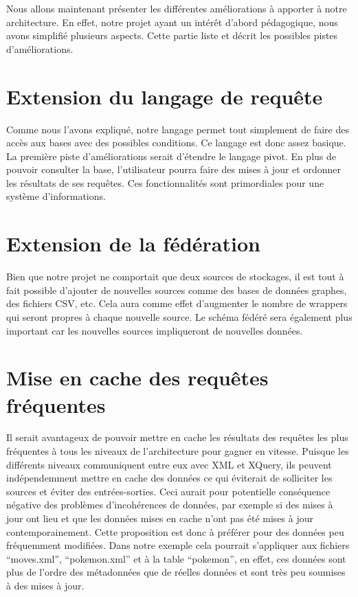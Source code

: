 Nous allons maintenant présenter les différentes améliorations à apporter à notre architecture. En effet, notre projet ayant un intérêt d’abord pédagogique, nous avons simplifié plusieurs aspects. Cette partie liste et décrit les possibles pistes d’améliorations.

\section{Extension du langage de requête}

Comme nous l’avons expliqué, notre langage permet tout simplement de faire des accès aux bases avec des possibles conditions. Ce langage est donc assez basique. La première piste d’améliorations serait d’étendre le langage pivot. En plus de pouvoir consulter la base, l’utilisateur pourra faire des mises à jour et ordonner les résultats de ses requêtes. Ces fonctionnalités sont primordiales pour une système d’informations.

\section{Extension de la fédération}

Bien que notre projet ne comportait que deux sources de stockages, il est tout à fait possible d’ajouter de nouvelles sources comme des bases de données graphes, des fichiers CSV, etc. Cela aura comme effet d’augmenter le nombre de wrappers qui seront propres à chaque nouvelle source. Le schéma fédéré sera également plus important car les nouvelles sources impliqueront de nouvelles données.

\section{ Mise en cache des requêtes fréquentes}

Il serait avantageux de pouvoir mettre en cache les résultats des requêtes les plus fréquentes à tous les niveaux de l’architecture pour gagner en vitesse. Puisque les différents niveaux communiquent entre eux avec XML et XQuery, ils peuvent indépendemment mettre en cache des données ce qui éviterait de solliciter les sources et éviter des entrées-sorties. Ceci aurait pour potentielle conséquence négative des problèmes d’incohérences de données, par exemple si des mises à jour ont lieu et que les données mises en cache n’ont pas été mises à jour contemporainement. Cette proposition est donc à préférer pour des données peu fréquemment modifiées. Dans notre exemple cela pourrait s’appliquer aux fichiers “moves.xml”, “pokemon.xml” et à la table “pokemon”, en effet, ces données sont plus de l’ordre des métadonnées que de réelles données et sont très peu soumises à des mises à jour.

